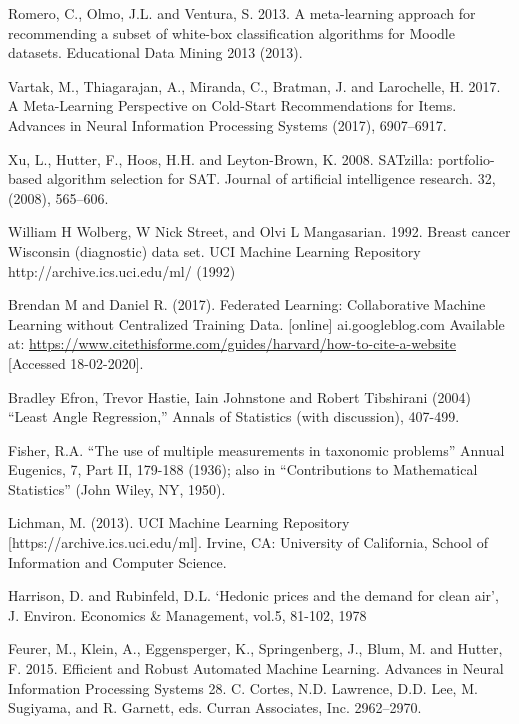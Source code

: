 \documentclass{article}
\begin{document}
\begin{thebibliography}{9}
Romero, C., Olmo, J.L. and Ventura, S. 2013. A meta-learning approach for recommending a subset of white-box classification algorithms for Moodle datasets. Educational Data Mining 2013 (2013).


Vartak, M., Thiagarajan, A., Miranda, C., Bratman, J. and Larochelle, H. 2017. A Meta-Learning Perspective on Cold-Start Recommendations for Items. Advances in Neural Information Processing Systems (2017), 6907–6917.

Xu, L., Hutter, F., Hoos, H.H. and Leyton-Brown, K. 2008. SATzilla: portfolio-based algorithm selection for SAT. Journal of artificial intelligence research. 32, (2008), 565–606.

William H Wolberg, W Nick Street, and Olvi L Mangasarian. 1992. Breast cancer Wisconsin (diagnostic) data set. UCI Machine Learning Repository {http://archive.ics.uci.edu/ml/} (1992)

Brendan M and Daniel R. (2017). Federated Learning: Collaborative Machine Learning without Centralized Training Data. [online] ai.googleblog.com Available at: \url{https://www.citethisforme.com/guides/harvard/how-to-cite-a-website} [Accessed 18-02-2020].

Bradley Efron, Trevor Hastie, Iain Johnstone and Robert Tibshirani (2004) “Least Angle Regression,” Annals of Statistics (with discussion), 407-499. 

Fisher, R.A. “The use of multiple measurements in taxonomic problems” Annual Eugenics, 7, Part II, 179-188 (1936); also in “Contributions to Mathematical Statistics” (John Wiley, NY, 1950).

Lichman, M. (2013). UCI Machine Learning Repository [https://archive.ics.uci.edu/ml]. Irvine, CA: University of California, School of Information and Computer Science.

Harrison, D. and Rubinfeld, D.L. ‘Hedonic prices and the demand for clean air’, J. Environ. Economics \& Management, vol.5, 81-102, 1978

Feurer, M., Klein, A., Eggensperger, K., Springenberg, J., Blum, M. and Hutter, F. 2015. Efficient and Robust Automated Machine Learning. Advances in Neural Information Processing Systems 28. C. Cortes, N.D. Lawrence, D.D. Lee, M. Sugiyama, and R. Garnett, eds. Curran Associates, Inc. 2962–2970.


\end{thebibliography}
\end{document}
